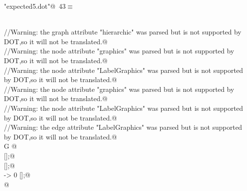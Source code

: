 \documentclass[a4paper]{report}
\begin{document}
\begin{flushleft}
\begin{minipage}{\linewidth}
\begin{list}{}{\setlength{\itemsep}{-\parsep}\setlength{\itemindent}{-\leftmargin}}
\item{}
\end{list}
\end{minipage}\vspace{4ex}
\end{flushleft}
\begin{flushleft} \small
\begin{minipage}{\linewidth}\label{scrap43}\raggedright\small
{} \verb@"expected5.dot"@\nobreak\ {\footnotesize {43}}$\equiv$
\vspace{-1ex}
\begin{list}{}{} \item
\mbox{}\verb@@\\
\mbox{}\verb@//Warning: the graph attribute "hierarchic" was parsed but is not supported by DOT,so it will not be translated.@\\
\mbox{}\verb@//Warning: the node attribute "graphics" was parsed but is not supported by DOT,so it will not be translated.@\\
\mbox{}\verb@//Warning: the node attribute "LabelGraphics" was parsed but is not supported by DOT,so it will not be translated.@\\
\mbox{}\verb@//Warning: the node attribute "graphics" was parsed but is not supported by DOT,so it will not be translated.@\\
\mbox{}\verb@//Warning: the node attribute "LabelGraphics" was parsed but is not supported by DOT,so it will not be translated.@\\
\mbox{}\verb@//Warning: the edge attribute "LabelGraphics" was parsed but is not supported by DOT,so it will not be translated.@\\
\mbox{}\verb@digraph G {@\\
\mbox{} [];@\\
\mbox{} [];@\\
\mbox{} -> 0 [];@\\
\mbox{}\verb@}@\\
\mbox{}\verb@@{\NWsep}
\end{list}
\vspace{-1.5ex}
\footnotesize
\begin{list}{}{\setlength{\itemsep}{-\parsep}\setlength{\itemindent}{-\leftmargin}}

\item{}
\end{list}
\end{minipage}\vspace{4ex}
\end{flushleft}
\newpage
\end{document}

